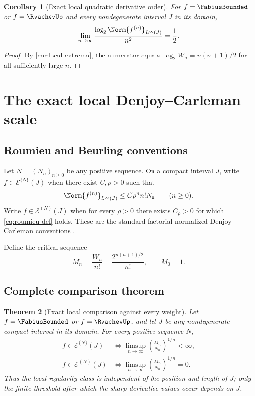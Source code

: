 \documentclass[11pt,a4paper]{article}
\newtheorem{theorem}{Theorem}[section]
\newtheorem{corollary}[theorem]{Corollary}
\theoremstyle{definition}
\theoremstyle{remark}
\newcommand{\Roumieu}[1]{\mathcal{E}^{\{#1\}}}
\newcommand{\Beurling}[1]{\mathcal{E}^{(#1)}}
\begin{document}
\begin{corollary}[Exact local quadratic derivative order]
\label{cor:local-order}
For $f=\FabiusBounded$ or $f=\RvachevUp$ and every nondegenerate interval $J$ in its domain,
\begin{equation}
 \lim_{n\to\infty}
 \frac{\log_2\Norm{f^{(n)}}_{L^\infty(J)}}{n^2}
 =\frac12.
 \label{eq:quadratic-order}
\end{equation}
\end{corollary}

\begin{proof}
By \cref{cor:local-extrema}, the numerator equals
$\log_2W_n=n(n+1)/2$ for all sufficiently large $n$.
\end{proof}

\section{The exact local Denjoy--Carleman scale}
\label{sec:dc-classification}

\subsection{Roumieu and Beurling conventions}

Let $N=(N_n)_{n\ge0}$ be any positive sequence.  On a compact interval $J$, write
$f\in\Roumieu{N}(J)$ when there exist $C,\rho>0$ such that
\begin{equation}
  \Norm{f^{(n)}}_{L^\infty(J)}
  \le C\rho^n n!N_n
  \qquad(n\ge0).
  \label{eq:roumieu-def}
\end{equation}
Write $f\in\Beurling{N}(J)$ when for every $\rho>0$ there exists $C_\rho>0$ for
which \eqref{eq:roumieu-def} holds.  These are the standard factorial-normalized
Denjoy--Carleman conventions \cite{RainerClosedSets,RainerSchindl}.

Define the critical sequence
\begin{equation}
  M_n=\frac{W_n}{n!}
  =\frac{2^{n(n+1)/2}}{n!},
  \qquad M_0=1.
  \label{eq:critical-weight}
\end{equation}

\subsection{Complete comparison theorem}

\begin{theorem}[Exact local comparison against every weight]
\label{thm:dc-classification}
Let $f=\FabiusBounded$ or $f=\RvachevUp$, and let $J$ be any nondegenerate compact interval in its
domain.  For every positive sequence $N$,
\begin{align}
  f\in\Roumieu{N}(J)
  &\iff
  \limsup_{n\to\infty}
  \left(\frac{M_n}{N_n}\right)^{1/n}<\infty,
  \label{eq:roumieu-criterion}\\
  f\in\Beurling{N}(J)
  &\iff
  \limsup_{n\to\infty}
  \left(\frac{M_n}{N_n}\right)^{1/n}=0.
  \label{eq:beurling-criterion}
\end{align}
Thus the local regularity class is independent of the position and length of $J$;
only the finite threshold after which the sharp derivative values occur depends on
$J$.
\end{theorem}
\end{document}
